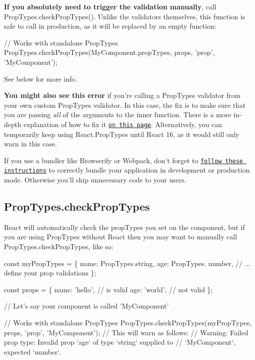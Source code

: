 {\bfseries If you absolutely need to trigger the validation manually}, call {\ttfamily Prop\+Types.\+check\+Prop\+Types()}. Unlike the validators themselves, this function is safe to call in production, as it will be replaced by an empty function\+:


\begin{DoxyCode}
// Works with standalone PropTypes
PropTypes.checkPropTypes(MyComponent.propTypes, props, 'prop', 'MyComponent');
\end{DoxyCode}
 See below for more info.

{\bfseries You might also see this error} if you’re calling a {\ttfamily Prop\+Types} validator from your own custom {\ttfamily Prop\+Types} validator. In this case, the fix is to make sure that you are passing {\itshape all} of the arguments to the inner function. There is a more in-\/depth explanation of how to fix it \href{https://facebook.github.io/react/warnings/dont-call-proptypes.html#fixing-the-false-positive-in-third-party-proptypes}{\tt on this page}. Alternatively, you can temporarily keep using {\ttfamily React.\+Prop\+Types} until React 16, as it would still only warn in this case.

If you use a bundler like Browserify or Webpack, don’t forget to \href{https://facebook.github.io/react/docs/installation.html#development-and-production-versions}{\tt follow these instructions} to correctly bundle your application in development or production mode. Otherwise you’ll ship unnecessary code to your users.

\subsection*{Prop\+Types.\+check\+Prop\+Types}

React will automatically check the prop\+Types you set on the component, but if you are using Prop\+Types without React then you may want to manually call {\ttfamily Prop\+Types.\+check\+Prop\+Types}, like so\+:


\begin{DoxyCode}
const myPropTypes = \{
  name: PropTypes.string,
  age: PropTypes. number,
  // ... define your prop validations
\};

const props = \{
  name: 'hello', // is valid
  age: 'world', // not valid
\};

// Let's say your component is called 'MyComponent'

// Works with standalone PropTypes
PropTypes.checkPropTypes(myPropTypes, props, 'prop', 'MyComponent');
// This will warn as follows:
// Warning: Failed prop type: Invalid prop `age` of type `string` supplied to
// `MyComponent`, expected `number`.
\end{DoxyCode}
 